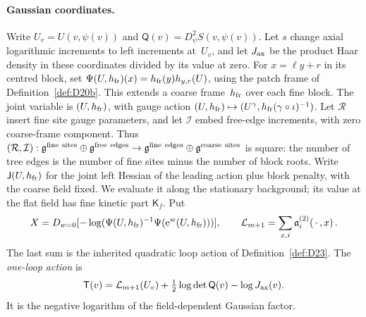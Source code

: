 \paragraph{Gaussian coordinates.}
Write $U_v=U(v,\psi(v))$ and $\mathsf Q(v)=D_\psi^2S(v,\psi(v))$. Let $s$ change axial logarithmic increments to left increments at~$U_v$, and let $J_{\rm ax}$ be the product Haar density in these coordinates divided by its value at zero. For $x=\ell y+r$ in its centred block, set $\Psi(U,h_{\rm fr})(x)=h_{\rm fr}(y)h_{y,r}(U)$, using the patch frame of Definition~\ref{def:D20b}. This extends a coarse frame~$h_{\rm fr}$ over each fine block. The joint variable is $(U,h_{\rm fr})$, with gauge action
$(U,h_{\rm fr})\mapsto(U^\gamma,h_{\rm fr}(\gamma\circ\iota)^{-1})$.
Let $\mathcal R$ insert fine site gauge parameters, and let $\mathcal I$ embed free-edge increments, with zero coarse-frame component. Thus
$(\mathcal R,\mathcal I):\g^{\rm fine\ sites}\oplus\g^{\rm free\ edges}\to\g^{\rm fine\ edges}\oplus\g^{\rm coarse\ sites}$ is square: the number of tree edges is the number of fine sites minus the number of block roots. Write $\mathsf J(U,h_{\rm fr})$ for the joint left Hessian of the leading action plus block penalty, with the coarse field fixed. We evaluate it along the stationary background; its value at the flat field has fine kinetic part $\mathsf K_f$. Put
\begin{equation*}
X=D_{w=0}[-\log(\Psi(U,h_{\rm fr})^{-1}\Psi(\mathrm e^w(U,h_{\rm fr})))],\qquad
\mathcal L_{m+1}=\sum_{x,i}\mathfrak a_i^{(2)}(\,\cdot\,,x)\,.
\end{equation*}
The last sum is the inherited quadratic loop action of Definition~\ref{def:D23}. The \emph{one-loop action} is
\begin{equation*}
\mathsf T(v)=\mathcal L_{m+1}(U_v)+\tfrac12\log\det\mathsf Q(v)-\log J_{\rm ax}(v).
\end{equation*}
It is the negative logarithm of the field-dependent Gaussian factor.

